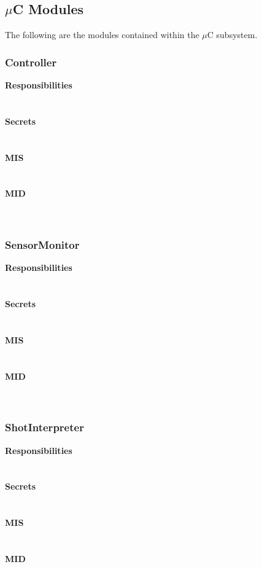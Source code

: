 \documentclass[titlepage]{article}
\begin{document}
\subsection{$\mu$C Modules}
The following are the modules contained within the $\mu$C subsystem.
\subsubsection{Controller}
\textbf{Responsibilities}\\
\\\\%
\textbf{Secrets}\\
\\\\%
\textbf{MIS}\\
\\\\%
\textbf{MID}\\
\\\\%
\subsubsection{SensorMonitor}
\textbf{Responsibilities}\\
\\\\%
\textbf{Secrets}\\
\\\\%
\textbf{MIS}\\
\\\\%
\textbf{MID}\\
\\\\%
\subsubsection{ShotInterpreter}
\textbf{Responsibilities}\\
\\\\%
\textbf{Secrets}\\
\\\\%
\textbf{MIS}\\
\\\\%
\textbf{MID}\\
\\\\%
\end{document}
